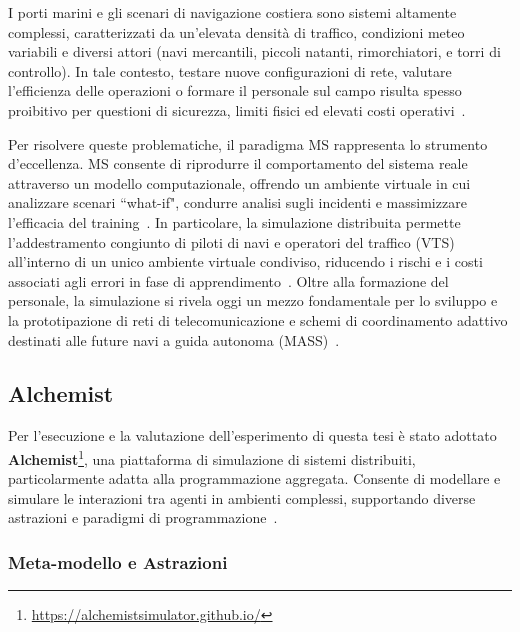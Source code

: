I porti marini e gli scenari di navigazione costiera sono sistemi altamente complessi, caratterizzati da un'elevata densità di traffico, condizioni meteo variabili e diversi attori (navi mercantili, piccoli natanti, rimorchiatori, e torri di controllo). In tale contesto, testare nuove configurazioni di rete, valutare l'efficienza delle operazioni o formare il personale sul campo risulta spesso proibitivo per questioni di sicurezza, limiti fisici ed elevati costi operativi~\cite{chiurco_phd}. 

Per risolvere queste problematiche, il paradigma \ac{MS} rappresenta lo strumento d'eccellenza. \ac{MS} consente di riprodurre il comportamento del sistema reale attraverso un modello computazionale, offrendo un ambiente virtuale in cui analizzare scenari ``what-if", condurre analisi sugli incidenti e massimizzare l'efficacia del training~\cite{chiurco_phd}. In particolare, la simulazione distribuita permette l'addestramento congiunto di piloti di navi e operatori del traffico (\ac{VTS}) all'interno di un unico ambiente virtuale condiviso, riducendo i rischi e i costi associati agli errori in fase di apprendimento~\cite{chiurco_phd}. Oltre alla formazione del personale, la simulazione si rivela oggi un mezzo fondamentale per lo sviluppo e la prototipazione di reti di telecomunicazione e schemi di coordinamento adattivo destinati alle future navi a guida autonoma (\ac{MASS})~\cite{11217861, chiurco_phd}.

\subsection{Alchemist}
\label{sec:alchemist}

Per l'esecuzione e la valutazione dell'esperimento di questa tesi è stato adottato \textbf{Alchemist}\footnote{\url{https://alchemistsimulator.github.io/}}, una piattaforma di simulazione di sistemi distribuiti, particolarmente adatta alla programmazione aggregata. Consente di modellare e simulare le interazioni tra agenti in ambienti complessi, supportando diverse astrazioni e paradigmi di programmazione~\cite{collektiveWeb}.

\subsubsection{Meta-modello e Astrazioni}
\label{sec:metamodello}

